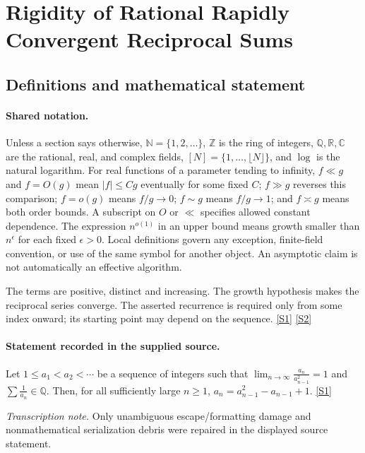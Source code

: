 \documentclass[11pt,a4paper]{article}
\newcommand{\N}{\mathbb{N}}
\newcommand{\Z}{\mathbb{Z}}
\newcommand{\Q}{\mathbb{Q}}
\newcommand{\R}{\mathbb{R}}
\newcommand{\C}{\mathbb{C}}
\newcommand{\sref}[2]{\hyperlink{source:#1:#2}{[S#2]}}
\begin{document}
\section{Rigidity of Rational Rapidly Convergent Reciprocal Sums}\label{statement}


\subsection{Definitions and mathematical statement}

\paragraph{Shared notation.}Unless a section says otherwise, $\N=\{1,2,\ldots\}$,
$\Z$ is the ring of integers, $\Q,\R,\C$ are the rational, real, and complex
fields, $[N]=\{1,\ldots,\lfloor N\rfloor\}$, and $\log$ is the natural
logarithm. For real functions of a parameter tending to infinity,
$f\ll g$ and $f=O(g)$ mean $|f|\leq Cg$ eventually for some fixed $C$;
$f\gg g$ reverses this comparison; $f=o(g)$ means $f/g\to0$;
$f\sim g$ means $f/g\to1$; and $f\asymp g$ means both order bounds.
A subscript on $O$ or $\ll$ specifies allowed constant dependence.
The expression $n^{o(1)}$ in an upper bound means growth smaller than
$n^\epsilon$ for each fixed $\epsilon>0$. Local definitions govern any
exception, finite-field convention, or use of the same symbol for another
object. An asymptotic claim is not automatically an effective algorithm.



The terms are positive, distinct and increasing. The growth hypothesis makes the reciprocal series converge. The asserted recurrence is required only from some index onward; its starting point may depend on the sequence. \sref{statement}{1} \sref{statement}{2}

\paragraph{Statement recorded in the supplied source.}
Let $1\leq a_1<a_2<\cdots$ be a sequence of integers such that $ \lim_{n\to \infty}\frac{a_n}{a_{n-1}^2}=1 $ and $\sum\frac{1}{a_n}\in \mathbb{Q}$. Then, for all sufficiently large $n\geq 1$, $  a_n = a_{n-1}^2-a_{n-1}+1. $ \sref{statement}{1}

{\small\emph{Transcription note.} Only unambiguous escape/formatting damage and nonmathematical serialization debris were repaired in the displayed source statement.}
\end{document}
